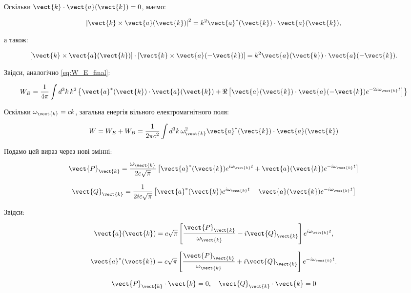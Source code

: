 Оскільки \(\vect{k} \cdot \vect{a}(\vect{k}) = 0\), маємо:

\begin{equation*}
\left| \vect{k} \times \vect{a}(\vect{k}) \right|^2 = k^2 \vect{a}^*(\vect{k}) \cdot \vect{a}(\vect{k}),
\end{equation*}

а також:

\begin{equation*}
\left[ \vect{k} \times \vect{a}(\vect{k}) \right] \cdot \left[ \vect{k} \times \vect{a}(-\vect{k}) \right] = k^2 \vect{a}(\vect{k}) \cdot
\vect{a}(-\vect{k}).
\end{equation*}

Звідси, аналогічно \eqref{eq:W_E_final}:

\begin{equation}
W_B = \frac{1}{4\pi} \int d^3k \, k^2 \left\{ \vect{a}^*(\vect{k}) \cdot \vect{a}(\vect{k}) + \Re \left[ \vect{a}(\vect{k}) \cdot
\vect{a}(-\vect{k}) e^{-2i\omega_{\vect{k}} t} \right] \right\}
\label{eq:W_B_final}
\end{equation}

Оскільки \(\omega_{\vect{k}} = ck\), загальна енергія вільного електромагнітного поля:

\begin{equation}
W = W_E + W_B = \frac{1}{2\pi c^2} \int d^3k \, \omega_{\vect{k}}^2 \vect{a}^*(\vect{k}) \cdot \vect{a}(\vect{k})
\label{eq:total_energy}
\end{equation}

Подамо цей вираз через нові змінні:

\begin{equation}
\vect{P}_{\vect{k}} = \frac{\omega_{\vect{k}}}{2c\sqrt{\pi}} \left[ \vect{a}^*(\vect{k}) e^{i\omega_{\vect{k}} t} + \vect{a}(\vect{k})
e^{-i\omega_{\vect{k}} t} \right]
\label{eq:P_k}
\end{equation}

\begin{equation}
\vect{Q}_{\vect{k}} = \frac{1}{2ic\sqrt{\pi}} \left[ \vect{a}^*(\vect{k}) e^{i\omega_{\vect{k}} t} - \vect{a}(\vect{k}) e^{-i\omega_{\vect{k}} t} \right]
\label{eq:Q_k}
\end{equation}

Звідси:

\begin{equation*}
\vect{a}(\vect{k}) = c\sqrt{\pi} \left[ \frac{\vect{P}_{\vect{k}}}{\omega_{\vect{k}}} - i\vect{Q}_{\vect{k}} \right] e^{i\omega_{\vect{k}} t},
\end{equation*}

\begin{equation*}
\vect{a}^*(\vect{k}) = c\sqrt{\pi} \left[ \frac{\vect{P}_{\vect{k}}}{\omega_{\vect{k}}} + i\vect{Q}_{\vect{k}} \right] e^{-i\omega_{\vect{k}} t}.
\end{equation*}

\begin{equation*}
\vect{P}_{\vect{k}} \cdot \vect{k} = 0, \quad \vect{Q}_{\vect{k}} \cdot \vect{k} = 0
\end{equation*}